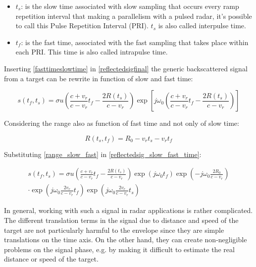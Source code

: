 \begin{itemize}
     \item \textbf{$t_{s}$}: is the slow time associated with slow sampling that occurs every ramp repetition interval that making a parallelism with a pulsed radar, it's possible to call this Pulse Repetition Interval (PRI). $t_{s}$ is also called interpulse time.

         
    \item \textbf{$t_{f}$}: is the fast time, associated with the fast sampling that takes place within each PRI. This time is also called intrapulse time.
    
\end{itemize}

Inserting \ref{fasttimeslowtime} in \ref{reflectedsigfinal} the generic backscattered signal from a target can be rewrite in function of slow and fast time:

\begin{equation}
s\left(t_{f}, t_{s}\right)=\sigma u\left(\frac{c+v_{r}}{c-v_{r}} t_{f}-\frac{2 R\left(t_{s}\right)}{c-v_{r}}\right) \exp \left[j \omega_{0}\left(\frac{c+v_{r}}{c-v_{r}} t_{f}-\frac{2 R\left(t_{s}\right)}{c-v_{r}}\right)\right]
\label{reflectedsig_slow_fast_time}
\end{equation}

Considering the range also as function of fast time and not only of slow time:

\begin{equation}
R\left(t_{s},t_{f}\right)=R_{0}-v_{r} t_{s}-v_{r} t_{f}
\label{range_slow_fast}
\end{equation}

Substituting \ref{range_slow_fast} in \ref{reflectedsig_slow_fast_time}:

\begin{equation}
\begin{array}{c}
s\left(t_{f}, t_{s}\right)=\sigma u\left(\frac{c+v_{r}}{c-v_{r}} t_{f}-\frac{2 R\left(t_{s}\right)}{c-v_{r}}\right) \exp \left(j \omega_{0} t_{f}\right) \exp \left(-j \omega_{0} \frac{2 R_{0}}{c-v_{r}}\right) \\
\cdot \exp \left(j \omega_{0} \frac{2 v_{r}}{c-v_{r}} t_{f}\right) \exp \left(j \omega_{0} \frac{2 v_{r}}{c-v_{r}} t_{s}\right)
\end{array}
\label{completeformula}
\end{equation}


In general, working with such a signal in radar applications is rather complicated.  The different translation terms in the signal due to distance and speed of the target are not particularly harmful to the envelope since they are simple translations on the time axis. On the other hand, they can create non-negligible problems on the signal phase, e.g. by making it difficult to estimate the real distance or speed of the target.

